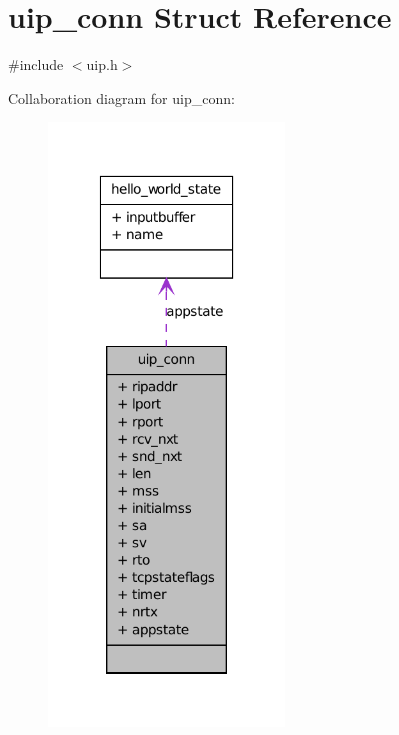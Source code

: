 \hypertarget{structuip__conn}{
\section{uip\_\-conn Struct Reference}
\label{structuip__conn}
}


{\ttfamily \#include $<$uip.h$>$}



Collaboration diagram for uip\_\-conn:
\nopagebreak
\begin{figure}[H]
\begin{center}
\leavevmode
\includegraphics[width=178pt]{structuip__conn__coll__graph}
\end{center}
\end{figure}
